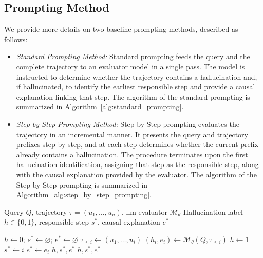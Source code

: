 \subsection{Prompting Method}
\label{appendix_evaluation_method}
We provide more details on two baseline prompting methods, described as follows:
\begin{itemize}[noitemsep,left=2pt, itemsep=0pt, topsep=0pt]
\item \textit{Standard Prompting Method:} Standard prompting feeds the query and the complete trajectory to an evaluator model in a single pass. The model is instructed to determine whether the trajectory contains a hallucination and, if hallucinated, to identify the earliest responsible step and provide a causal explanation linking that step. The algorithm of the standard prompting is summarized in Algorithm~\ref{alg:standard_prompting}.

\item \textit{Step-by-Step Prompting Method:} 
Step-by-Step prompting evaluates the trajectory in an incremental manner. It presents the query and trajectory prefixes step by step, and at each step determines whether the current prefix already contains a hallucination. The procedure terminates upon the first hallucination identification, assigning that step as the responsible step,  along with the causal explanation provided by the evaluator. The algorithm of the Step-by-Step prompting is summarized in Algorithm~\ref{alg:step_by_step_prompting}.
\end{itemize}

\begin{algorithm}[htb]
\setlength{\lineskip}{0.1em}
\setlength{\lineskiplimit}{0.1em}
\caption{Step-by-Step Prompting}
\label{alg:step_by_step_prompting}
\begin{algorithmic}[1]
\Require Query $Q$, trajectory $\tau = (u_1, \ldots, u_n)$, llm evaluator $\mathcal{M}_{\theta}$
\Ensure Hallucination label $h\in\{0,1\}$, responsible step $s^*$, causal explanation $e^*$

\State $h \gets 0$; $s^* \gets \varnothing$; $e^* \gets \varnothing$
    \State $\tau_{\le i} \gets (u_1, \ldots, u_i)$
    \State $(h_i, e_i) \gets \mathcal{M}_{\theta}(Q, \tau_{\le i})$
        \State $h \gets 1$
        \State $s^* \gets i$
        \State $e^* \gets e_i$ 
        \State \Return $h, s^*, e^*$
    \EndIf
\EndFor
\State \Return $h, s^*, e^*$ 
\end{algorithmic}
\end{algorithm}


